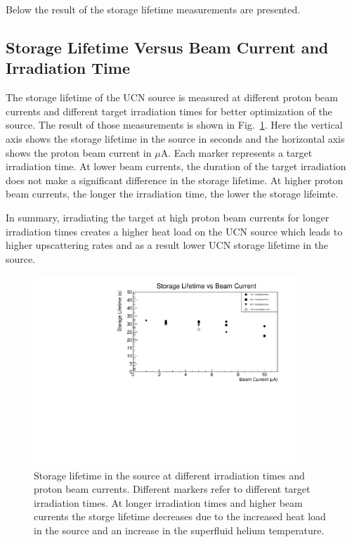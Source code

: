Below the result of the storage lifetime measurements are presented.

\subsection{Storage Lifetime Versus Beam Current and Irradiation Time}
The storage lifetime of the UCN source is measured at different proton
beam currents and different target irradiation times for better
optimization of the source. The result of those measurements is shown
in Fig.~\ref{fig:storage_beam_irrad}. Here the vertical axis shows the
storage lifetime in the source in seconds and the horizontal axis
shows the proton beam current in $\mu$A. Each marker represents a
target irradiation time. At lower beam currents, the duration of the
target irradiation does not make a significant difference in the
storage lifetime. At higher proton beam currents, the longer the
irradiation time, the lower the storage lifeimte.

In summary, irradiating the target at high proton beam currents for
longer irradiation times creates a higher heat load on the UCN source
which leads to higher upscattering rates and as a result lower UCN
storage lifetime in the source.

\begin{figure}[h!]
  \centering
  \includegraphics[width=0.9\textwidth]{StorageLifetime_17009_and_17009A.pdf}
  \caption{Storage lifetime in the source at different irradiation
    times and proton beam currents. Different markers refer to
    different target irradiation times. At longer irradiation times
    and higher beam currents the storge lifetime decreases due to the
    increased heat load in the source and an increase in the
    superfluid helium temperature. }
  \label{fig:storage_beam_irrad}
\end{figure}


